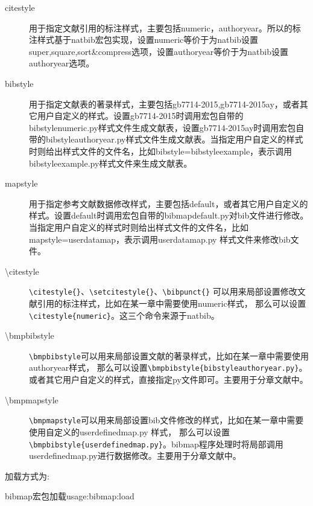 \documentclass{article}
\begin{document}
\begin{description}
  \item[citestyle] 用于指定文献引用的标注样式，主要包括numeric，authoryear。所以的标注样式基于natbib宏包实现，设置numeric等价于为natbib设置super,square,sort\&compress选项，设置authoryear等价于为natbib设置authoryear选项。

  \item[bibstyle] 用于指定文献表的著录样式，主要包括gb7714-2015,gb7714-2015ay，或者其它用户自定义的样式。设置gb7714-2015时调用宏包自带的bibstylenumeric.py样式文件生成文献表，设置gb7714-2015ay时调用宏包自带的bibstyleauthoryear.py样式文件生成文献表。当指定用户自定义的样式时则给出样式文件的文件名，比如bibstyle=bibstyleexample，表示调用bibstyleexample.py样式文件来生成文献表。

  \item[mapstyle] 用于指定参考文献数据修改样式，主要包括default，或者其它用户自定义的样式。设置default时调用宏包自带的bibmapdefault.py对bib文件进行修改。当指定用户自定义的样式时则给出样式文件的文件名，比如mapstyle=userdatamap，表示调用userdatamap.py 样式文件来修改bib文件。

  \item[\textbackslash citestyle]
  \verb|\citestyle{}|、\verb|\setcitestyle{}|、\verb|\bibpunct{}| 可以用来局部设置修改文献引用的标注样式，比如在某一章中需要使用numeric样式，
  那么可以设置\verb|\citestyle{numeric}|。这三个命令来源于natbib。

  \item[\textbackslash bmpbibstyle]
  \verb|\bmpbibstyle|可以用来局部设置文献的著录样式，比如在某一章中需要使用authoryear样式，
  那么可以设置\verb|\bmpbibstyle{bibstyleauthoryear.py}|。或者其它用户自定义的样式，直接指定py文件即可。主要用于分章文献中。

  \item[\textbackslash bmpmapstyle]
  \verb|\bmpmapstyle|可以用来局部设置bib文件修改的样式，比如在某一章中需要使用自定义的userdefinedmap.py 样式，
  那么可以设置\verb|\bmpbibstyle{userdefinedmap.py}|。bibmap程序处理时将局部调用userdefinedmap.py进行数据修改。主要用于分章文献中。

\end{description}

加载方式为:
\begin{example}{bibmap宏包加载}{usage:bibmap:load}
\begin{texlist}
\usepackage[citesytle=numeric,bibstyle=gb7714-2015]{bibmap}
\end{texlist}
\end{example}
\end{document}
